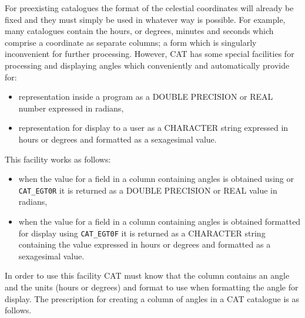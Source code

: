 For preexisting catalogues the format of the celestial
coordinates will already be fixed and they must simply be used
in whatever way is possible. For example, many catalogues
contain the hours, or degrees, minutes and seconds which
comprise a coordinate as separate columns; a form which is
singularly inconvenient for further processing. However, CAT has
some special facilities for processing and displaying angles
which conveniently and automatically provide for:

\begin{itemize}

  \item representation inside a program as a DOUBLE PRECISION or
   REAL number expressed in radians,

  \item representation for display to a user as a CHARACTER
   string expressed in hours or degrees and formatted as a
   sexagesimal value.

\end{itemize}

This facility works as follows:

\begin{itemize}

  \item when the value for a field in a column containing angles
   is obtained using
   or {\tt CAT\_EGT0R} it is returned as a
   DOUBLE PRECISION or REAL value in radians,

  \item when the value for a field in a column containing angles
   is obtained formatted for display using {\tt CAT\_EGT0F} it is
   returned as a CHARACTER string containing the value expressed in
   hours or degrees and formatted as a sexagesimal value.

\end{itemize}

In order to use this facility CAT must know that the column
contains an angle and the units (hours or degrees) and format to
use when formatting the angle for display. The prescription for
creating a column of angles in a CAT catalogue is as follows.

